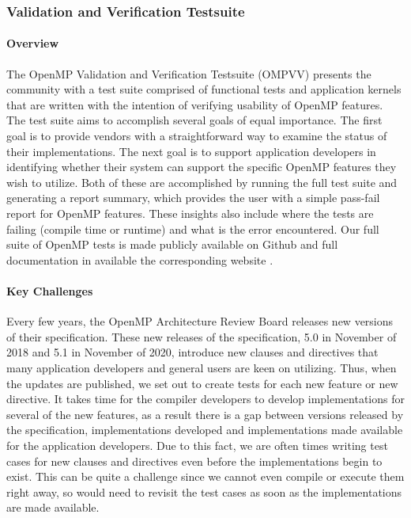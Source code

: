 \subsubsection{Validation and Verification Testsuite}

\paragraph{Overview}
The OpenMP Validation and Verification Testsuite (OMPVV) presents the community with a test suite comprised of functional tests and application kernels that are written with the intention of verifying usability of OpenMP features. The test suite aims to accomplish several goals of equal importance. The first goal is to provide vendors with a straightforward way to examine the status of their implementations. The next goal is to support application developers in identifying whether their system can support the specific OpenMP features they wish to utilize. Both of these are accomplished by running the full test suite and generating a report summary, which provides the user with a simple pass-fail report for OpenMP features. These insights also include where the tests are failing (compile time or runtime) and what is the error encountered. Our full suite of OpenMP tests is made publicly available on Github \cite{sollvevvgithub} and full documentation in available the corresponding website \cite{sollvevvwebsite}. 

\paragraph{Key Challenges}
Every few years, the OpenMP Architecture Review Board releases new versions of their specification. These new releases of the specification, 5.0 in November of 2018 and 5.1 in November of 2020, introduce new clauses and directives that many application developers and general users are keen on utilizing. Thus, when the updates are published, we set out to create tests for each new feature or new directive. It takes time for the compiler developers to develop implementations for several of the new features, as a result there is a gap between versions released by the specification, implementations developed and implementations made available for the application developers. Due to this fact, we are often times writing test cases for new clauses and directives even before the implementations begin to exist. This can be quite a challenge since we cannot even compile or execute them right away, so would need to revisit the test cases as soon as the implementations are made available. 

